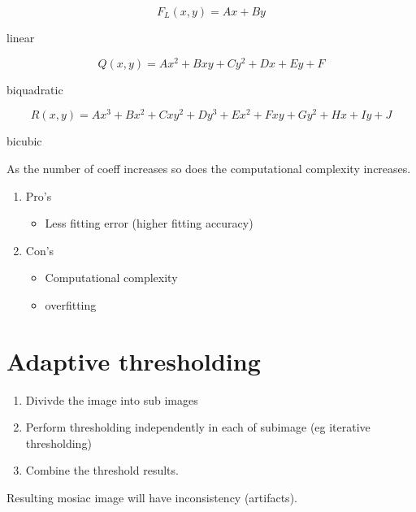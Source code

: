 \documentclass[11pt]{article}
\theoremstyle{definition}
\begin{document}
\begin{equation}
F_L(x,y) = Ax + By
\end{equation}
\begin{center}
linear
\end{center}

\begin{equation}
Q(x, y) = Ax^2 + Bxy + Cy^2 + Dx + Ey + F
\end{equation}
\begin{center}
biquadratic
\end{center}

\begin{equation}
R(x,y) = Ax^3 + Bx^2 + Cxy^2 + Dy^3 + Ex^2 + Fxy + Gy^2 + Hx + Iy + J
\end{equation}
\begin{center}
bicubic
\end{center}

As the number of coeff increases so does the computational complexity increases.

\begin{enumerate}
    \item Pro's
    \begin{itemize}
        \item Less fitting error (higher fitting accuracy)
    \end{itemize}
    
    \item Con's
    \begin{itemize}
        \item Computational complexity
        \item overfitting
    \end{itemize}
\end{enumerate}


\newpage
\section{Adaptive thresholding}
\begin{enumerate}
    \item Divivde the image into sub images
    \item Perform thresholding independently in each of subimage (eg iterative thresholding)
    \item Combine the threshold results.
\end{enumerate}

Resulting mosiac image will have inconsistency (artifacts).
\end{document}
